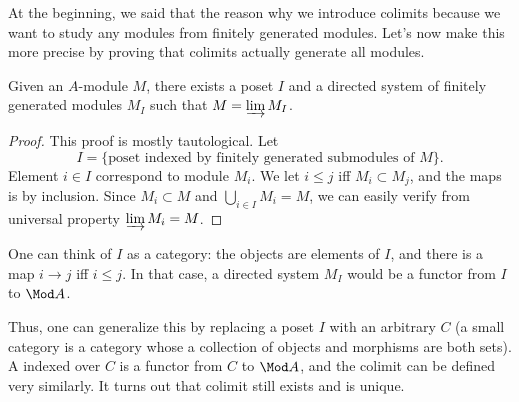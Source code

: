 At the beginning, we said that
the reason why we introduce colimits because
we want to study any modules from
finitely generated modules. Let's now make this more precise
by proving that colimits actually generate all modules.
\begin{proposition}
    \label{prop:direct_limit_fingen}
    Given an $A$-module $M$, there exists a poset $I$
    and a directed system of finitely generated modules $M_I$
    such that $M = \varinjlim M_I$.
\end{proposition}
\begin{proof}
    This proof is mostly tautological.
    Let 
    $$I = \{\text{poset indexed by finitely generated submodules of }M\}.$$
    Element $i\in I$ correspond to module $M_i$.
    We let $i\leq j$ iff $M_i\subset M_j$,
    and the maps is by inclusion.
    Since $M_i\subset M$ and $\bigcup_{i\in I} M_i=M$, 
    we can easily verify from universal property $\varinjlim M_i = M$.
\end{proof}
\begin{remark}
    One can think of $I$ as a category: the objects are
    elements of $I$, and there is a map $i\to j$
    iff $i\leq j$. In that case, a directed system $M_I$
    would be a functor from $I$ to $\Mod A$.
    
    Thus, one can generalize this by replacing a poset $I$
    with an arbitrary  $C$
    (a small category is a category whose a 
    collection of objects and morphisms are both sets).
    A  indexed over $C$
    is a functor from $C$ to $\Mod A$,
    and the colimit can be defined very similarly.
    It turns out that colimit still exists and is unique.
\end{remark}
